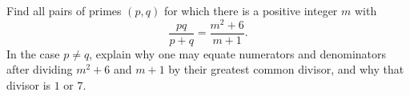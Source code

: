 Find all pairs of primes $(p,q)$ for which there is a positive integer $m$ with
\[\dfrac{pq}{p+q}=\dfrac{m^2+6}{m+1}.\]
In the case $p\ne q$, explain why one may equate numerators and denominators after dividing $m^2+6$ and $m+1$ by their greatest common divisor, and why that divisor is $1$ or $7$.
